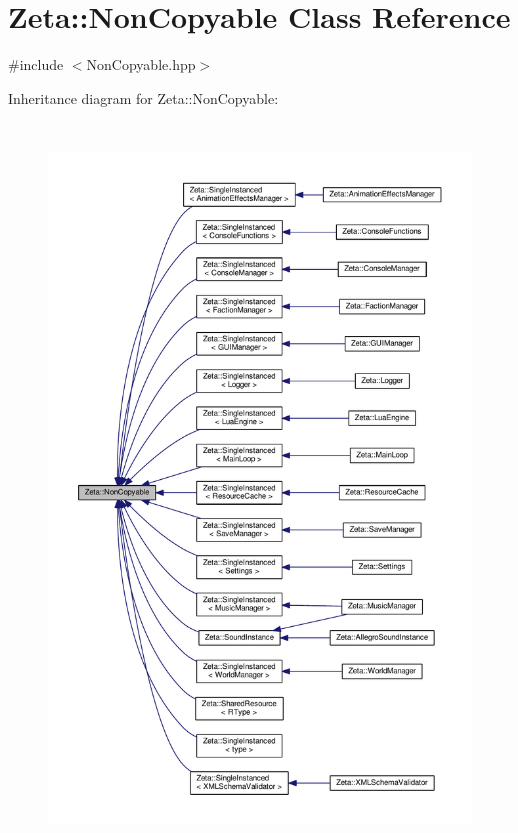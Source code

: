 \hypertarget{classZeta_1_1NonCopyable}{\section{Zeta\+:\+:Non\+Copyable Class Reference}
\label{classZeta_1_1NonCopyable}
}


{\ttfamily \#include $<$Non\+Copyable.\+hpp$>$}



Inheritance diagram for Zeta\+:\+:Non\+Copyable\+:\nopagebreak
\begin{figure}[H]
\begin{center}
\leavevmode
\includegraphics[height=550pt]{classZeta_1_1NonCopyable__inherit__graph}
\end{center}
\end{figure}
